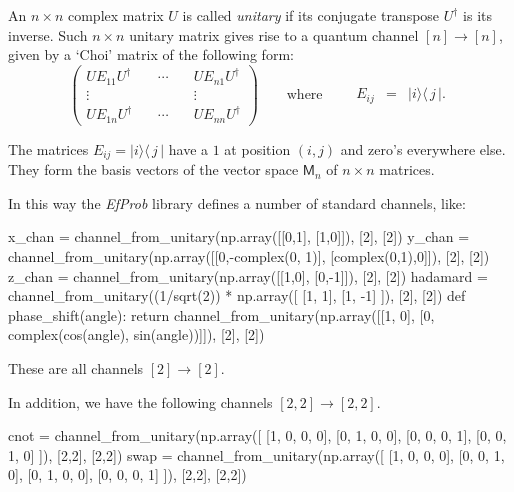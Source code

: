 \documentclass[leqno]{tufte-book} %
\newcommand{\EfProb}{\textit{EfProb}\xspace}
\newcommand{\Mat}{\mathsf{M}}
\newcommand{\ket}[1]{\ensuremath{|#1\rangle}}
\newcommand{\bra}[1]{\langle\,#1\,|}
\begin{document}
An $n\times n$ complex matrix $U$ is called \emph{unitary} if its
conjugate transpose $U^\dag$ is its inverse. Such $n\times n$ unitary
matrix gives rise to a quantum channel $[n] \rightarrow [n]$, given by
a `Choi' matrix of the following form:
$$\left(\begin{array}{ccc}
UE_{11}U^{\dag} & \quad\cdots\quad & UE_{n1}U^{\dag}
\\
\vdots & & \vdots
\\
UE_{1n}U^{\dag} & \quad\cdots\quad & UE_{nn}U^{\dag}
\end{array}\right)
\qquad\mbox{where}\qquad
{\begin{array}{rcl}
E_{ij}
& = &
\ket{i}\bra{j}.
\end{array}}$$

\noindent The matrices $E_{ij} = \ket{i}\bra{j}$ have a $1$ at
position $(i,j)$ and zero's everywhere else. They form the basis
vectors of the vector space $\Mat_{n}$ of $n\times n$ matrices.

In this way the \EfProb library defines a number of standard
channels, like:
\begin{python}
x_chan = channel_from_unitary(np.array([[0,1],
                                        [1,0]]), [2], [2])
y_chan = channel_from_unitary(np.array([[0,-complex(0, 1)],
                                        [complex(0,1),0]]), [2], [2])
z_chan = channel_from_unitary(np.array([[1,0],
                                        [0,-1]]), [2], [2])
hadamard = channel_from_unitary((1/sqrt(2)) * np.array([ [1, 1],
                                                         [1, -1] ]), [2], [2])
def phase_shift(angle):
    return channel_from_unitary(np.array([[1, 0],
                                          [0, complex(cos(angle),
                                                      sin(angle))]]), [2], [2])
\end{python}

\noindent These are all channels $[2] \rightarrow [2]$.

In addition, we have the following channels $[2,2] \rightarrow [2,2]$.
\begin{python}
cnot = channel_from_unitary(np.array([ [1, 0, 0, 0],
                                       [0, 1, 0, 0],
                                       [0, 0, 0, 1],
                                       [0, 0, 1, 0] ]), [2,2], [2,2])
swap = channel_from_unitary(np.array([ [1, 0, 0, 0],
                                       [0, 0, 1, 0],
                                       [0, 1, 0, 0],
                                       [0, 0, 0, 1] ]), [2,2], [2,2])
\end{python}
\end{document}

